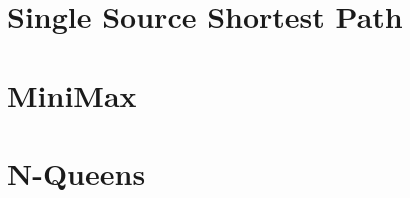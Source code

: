 \section{Single Source Shortest Path}\label{appendix:proofs:sssp}

\section{MiniMax}\label{appendix:proofs:minimax}

\section{N-Queens}\label{appendix:proofs:nqueens}

